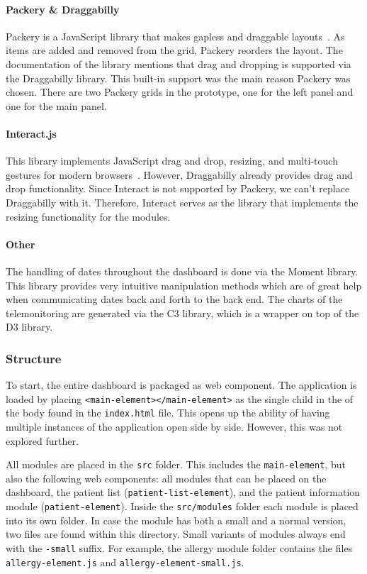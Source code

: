             \paragraph{Packery \& Draggabilly} Packery is a JavaScript library that makes gapless and draggable layouts~\cite{Packery}. As items are added and removed from the grid, Packery reorders the layout. The documentation of the library mentions that drag and dropping is supported via the Draggabilly library. This built-in support was the main reason Packery was chosen. There are two Packery grids in the prototype, one for the left panel and one for the main panel. 

            \paragraph{Interact.js} This library implements JavaScript drag and drop, resizing, and multi-touch gestures for modern browsers~\cite{Interact}. However, Draggabilly already provides drag and drop functionality. Since Interact is not supported by Packery, we can't replace Draggabilly with it. Therefore, Interact serves as the library that implements the resizing functionality for the modules.

            \paragraph{Other} The handling of dates throughout the dashboard is done via the Moment library. This library provides very intuitive manipulation methods which are of great help when communicating dates back and forth to the back end. The charts of the telemonitoring are generated via the C3 library, which is a wrapper on top of the D3 library.

        \subsubsection{Structure}

        To start, the entire dashboard is packaged as web component. The application is loaded by placing \texttt{<main-element></main-element>} as the single child in the of the body found in the \texttt{index.html} file. This opens up the ability of having multiple instances of the application open side by side. However, this was not explored further.

        All modules are placed in the \texttt{src} folder. This includes the \texttt{main-element}, but also the following web components: all modules that can be placed on the dashboard, the patient list (\texttt{patient-list-element}), and the patient information module (\texttt{patient-element}). Inside the \texttt{src/modules} folder each module is placed into its own folder. In case the module has both a small and a normal version, two files are found within this directory. Small variants of modules always end with the \texttt{-small} suffix. For example, the allergy module folder contains the files \texttt{allergy-element.js} and \texttt{allergy-element-small.js}.

